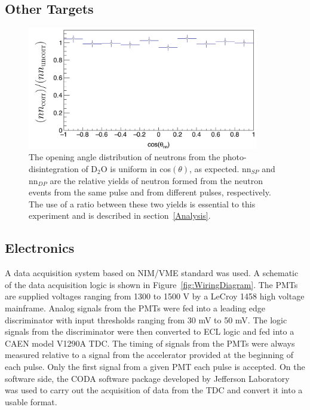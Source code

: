\subsection{Other Targets}
\begin{figure}[h]
\includegraphics[width=0.9\textwidth]{Content/Methods/D2Otheta_nn.png}
\caption{The opening angle distribution of neutrons from the photo-disintegration of D$_{2}$O  is uniform in cos$(\theta)$, as expected. 
nn$_{SP}$ and nn$_{DP}$ are the relative yields of neutron formed from the neutron events from the same pulse and from different pulses, respectively. 
 The use of a ratio between these two yields is essential to this experiment and is described in section~\ref{Analysis}.}
\label{fig:D2Otheta_nn}
\end{figure}

\subsection{Electronics}
A data acquisition system based on NIM/VME standard was used.
A schematic of the data acquisition logic is shown in Figure~\ref{fig:WiringDiagram}.
The PMTs are supplied voltages ranging from 1300 to 1500 V by a LeCroy 1458 high voltage mainframe.
Analog signals from the PMTs were fed into a leading edge discriminator with input thresholds ranging from 30 mV to 50 mV.
The logic signals from the discriminator were then converted to ECL logic and fed into a CAEN model V1290A TDC.
The timing of signals from the PMTs were always measured relative to a signal from the accelerator provided at the beginning of each pulse.
Only the first signal from a given PMT each pulse is accepted.
On the software side, the CODA software package developed by Jefferson Laboratory~\cite{CODA} was used to carry out the acquisition of data from the TDC and convert it into a usable format.

